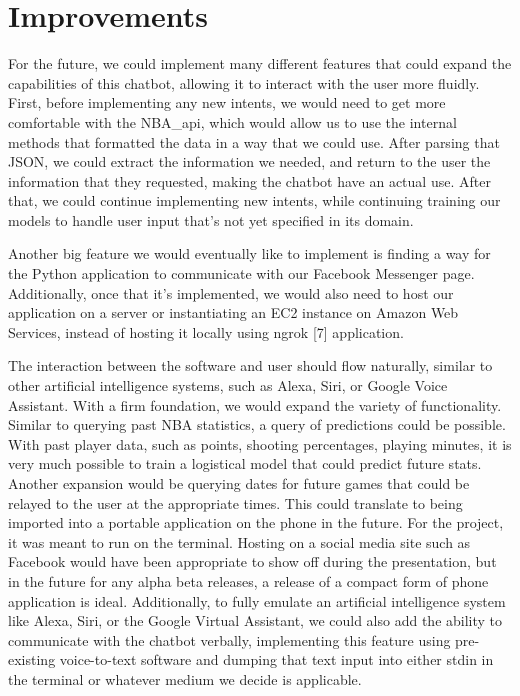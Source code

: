 \documentclass[conference]{IEEEtran}
\begin{document}
\section*{Improvements}
For the future, we could implement many different features that could expand the capabilities of this chatbot, allowing it to interact with the user more fluidly. First, before implementing any new intents, we would need to get more comfortable with the NBA\_api, which would allow us to use the internal methods that formatted the data in a way that we could use. After parsing that JSON, we could extract the information we needed, and return to the user the information that they requested, making the chatbot have an actual use. After that, we could continue implementing new intents, while continuing training our models to handle user input that's not yet specified in its domain.

Another big feature we would eventually like to implement is finding a way for the Python application to communicate with our Facebook Messenger page. Additionally, once that it's implemented, we would also need to host our application on a server or instantiating an EC2 instance on Amazon Web Services, instead of hosting it locally using ngrok [7] application. 

The interaction between the software and user should flow naturally, similar to other artificial intelligence systems, such as Alexa, Siri, or Google Voice Assistant. With a firm foundation, we would expand the variety of functionality. Similar to querying past NBA statistics, a query of predictions could be possible. With past player data, such as points, shooting percentages, playing minutes, it is very much possible to train a logistical model that could predict future stats. Another expansion would be querying dates for future games that could be relayed to the user at the appropriate times. This could translate to being imported into a portable application on the phone in the future. For the project, it was meant to run on the terminal. Hosting on a social media site such as Facebook would have been appropriate to show off during the presentation, but in the future for any alpha beta releases, a release of a compact form of phone application is ideal. Additionally, to fully emulate an artificial intelligence system like Alexa, Siri, or the Google Virtual Assistant, we could also add the ability to communicate with the chatbot verbally, implementing this feature using pre-existing voice-to-text software and dumping that text input into either stdin in the terminal or whatever medium we decide is applicable.
\end{document}
